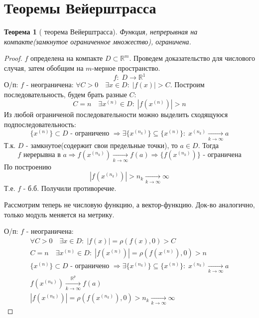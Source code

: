 \newcommand\R{\ensuremath{\mathbb{R}}}
\newcommand{\rom}[1]
    {\MakeUppercase{\romannumeral #1}}
\newtheorem{theorem}{Теорема}[section]
\theoremstyle{definition}
\newtheorem{definition}{Определение}[section]
\newpage
\section{Теоремы Вейерштрасса}
    
\begin{theorem}[\rom{1} теорема Вейерштрасса]
    Функция, непрерывная на компакте(замкнутое ограниченное множество), ограничена.
\end{theorem}

\begin{proof}
    $f$ определена на компакте $D \subset \R^m$. Проведем доказательство для числового случая, затем обобщим на $m$-мерное пространство.
    \[
        f:\; D \rightarrow \R^1
    \]
    О/п: $f$ - неограничена: $\forall C > 0 \quad \exists x \in D:\;|f(x)| > C$. 
    Построим последовательность, будем брать разные $C$:
    \[
        C=n \quad \exists x^{(n)} \in D:\; |f(x^{(n)})| > n
    \]
    Из любой ограниченой последовательности можно выделить сходящуюся подпоследовательность:
    \[
        \{x^{(n)}\} \subset D\text{ - ограничено }\Rightarrow \exists \{ x^{(n_k)} \} \subseteq \{x^{(n)}\}:\; x^{(n_k)} \xrightarrow[k \rightarrow \infty]{} a
    \]
    Т.к. $D$ - замкнутое(содержит свои предельные точки), то $a \in D$. Тогда
    \[
        f \text{ нерерывна в } a \Rightarrow f(x^{(n_k)}) \xrightarrow[k \rightarrow \infty]{} f(a) \Rightarrow \{f(x^{(n_k)})\} \text{ - ограничена} 
    \]
    По построению 
    \[
        |f(x^{(n_k)})| > n_k  \xrightarrow[k \rightarrow \infty]{} \infty
    \]
    Т.е. $f$ - б.б. Получили противоречие. 
        
    Рассмотрим теперь не числовую функцию, а вектор-функцию.
    Док-во аналогично, только модуль меняется на метрику.

    О/п: $f$ - неограничена:
    \begin{gather*}
        \forall C > 0 \quad \exists x \in D:\;|f(x)| = \rho(f(x), 0) > C\\
        C=n \quad \exists x^{(n)} \in D:\; |f(x^{(n)})| = \rho(f(x^{(n)}), 0) > n\\
        \{x^{(n)}\} \subset D\text{ - ограничено }\Rightarrow \exists \{ x^{(n_k)} \} \subseteq \{x^{(n)}\}:\; x^{(n_k)} \xrightarrow[k \rightarrow \infty]{} a\\
        f(x^{(n_k)}) \xrightarrow[k \rightarrow \infty]{\R^p} f(a)\\
        |f(x^{(n_k)})| = \rho(f(x^{(n_k)}), 0) > n_k  \xrightarrow[k \rightarrow \infty]{} \infty
    \end{gather*}

\end{proof}

